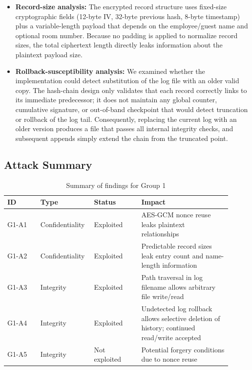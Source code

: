 \documentclass[a4paper, 12pt]{article}
\begin{document}
\begin{itemize}
        \item \textbf{Record-size analysis:} The encrypted record structure uses fixed-size cryptographic fields (12-byte IV, 32-byte previous hash, 8-byte timestamp) plus a variable-length payload that depends on the employee/guest name and optional room number. Because no padding is applied to normalize record sizes, the total ciphertext length directly leaks information about the plaintext payload size.

        \item \textbf{Rollback-susceptibility analysis:} We examined whether the implementation could detect substitution of the log file with an older valid copy. The hash-chain design only validates that each record correctly links to its immediate predecessor; it does not maintain any global counter, cumulative signature, or out-of-band checkpoint that would detect truncation or rollback of the log tail. Consequently, replacing the current log with an older version produces a file that passes all internal integrity checks, and subsequent appends simply extend the chain from the truncated point.
    \end{itemize}

    \subsection{Attack Summary}
    \begin{table}[H]
        \centering
        \begin{tabular}{@{}p{0.14\linewidth}p{0.19\linewidth}p{0.20\linewidth}p{0.38\linewidth}@{}}
            \toprule
            \textbf{ID} & \textbf{Type} & \textbf{Status} & \textbf{Impact} \\
            \midrule
            G1-A1 & Confidentiality & Exploited & AES-GCM nonce reuse leaks plaintext relationships \\
            G1-A2 & Confidentiality & Exploited & Predictable record sizes leak entry count and name-length information \\
            G1-A3 & Integrity & Exploited & Path traversal in log filename allows arbitrary file write/read \\
            G1-A4 & Integrity & Exploited & Undetected log rollback allows selective deletion of history; continued read/write accepted \\
            G1-A5 & Integrity & Not exploited & Potential forgery conditions due to nonce reuse \\
            \bottomrule
        \end{tabular}
        \caption{Summary of findings for Group 1}
    \end{table}
\end{document}
